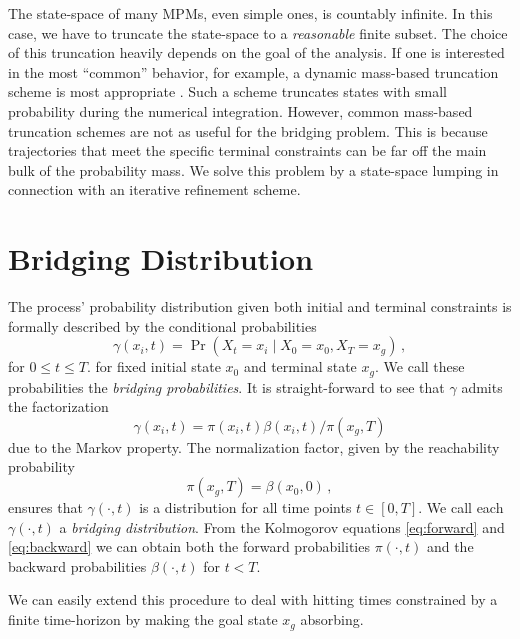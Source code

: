 The state-space of many \acp{MPM}, even simple ones, is countably infinite.
In this case, we have to truncate the state-space to a \emph{reasonable}
finite subset.
The choice of this truncation heavily depends on the goal of the
analysis.
If one is interested in the most ``common'' behavior, for example,
a dynamic mass-based truncation scheme is most appropriate \cite{mikeev2019approximate}.
Such a scheme truncates states with small probability during the numerical integration.
However, common mass-based truncation schemes are not as useful for the
bridging problem. This is because trajectories that meet
the specific terminal constraints can be far off the main bulk of the
probability mass.
We solve this problem by a state-space lumping in connection with an
iterative refinement scheme.


\section{Bridging Distribution}
The process' probability distribution given both initial and terminal constraints is formally described  by
the conditional probabilities
\begin{equation}\label{eq:bridge_dist}
    \gamma(x_i, t) = \Pr(X_t = x_i \mid X_0 = x_0, X_T = x_g)\,,
\end{equation}
for $0\leq t\leq T$.
for fixed initial state $x_0$ and terminal state $x_g$.
We call these probabilities the \emph{bridging probabilities}.
It is straight-forward to see that      $\gamma$ admits the
factorization
\begin{equation}\label{eq:bridge_fact}
    \gamma(x_i, t) = \pi(x_i, t)\beta(x_i, t)/\pi(x_g, T)
\end{equation}
due to the Markov property.
The normalization factor, given by the reachability probability 
\[
	\pi(x_g, T)=\beta(x_0, 0)\,,
\]
ensures that $\gamma(\cdot, t)$ is 
a distribution for all time points $t\in[0,T]$.
We call each $\gamma(\cdot, t)$ a   \emph{bridging distribution}.
From the Kolmogorov equations \eqref{eq:forward} and \eqref{eq:backward}
we can obtain both the forward probabilities $\pi(\cdot, t)$ and the backward probabilities
$\beta(\cdot, t)$ for $t< T$.


We can easily extend this procedure to deal with hitting times
constrained by a finite time-horizon by making the goal state $x_g$ absorbing.


